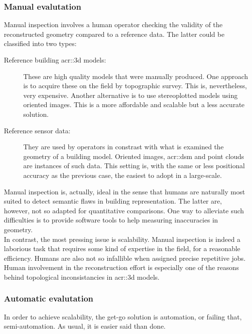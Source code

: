         \subsubsection{Manual evalutation}
            Manual inspection involves a human operator checking the validity of the reconstructed geometry compared to a reference data.
            The latter could be classified into two types:
            \begin{description}
                \item[Reference building \gls{acr::3d} models:] These are high quality models that were manually produced.
                    One approach is to acquire these on the field by topographic survey.
                    This is, nevertheless, very expensive.
                    Another alternative is to use stereoplotted models using oriented images.
                    This is a more affordable and scalable but a less accurate solution.
                \item[Reference sensor data:] They are used by operators in constrast with what is examined the geometry of a building model.
                    Oriented images, \gls{acr::dsm} and point clouds are instances of such data.
                    This setting is, with the same or less positional accuracy as the previous case, the easiest to adopt in a large-scale.
            \end{description}

            Manual inspection is, actually, ideal in the sense that humans are naturally most suited to detect semantic flaws in building representation.
            The latter are, however, not so adapted for quantitative comparisons.
            One way to alleviate such difficulties is to provide software tools to help measuring inaccuracies in geometry\addref.\\

            In contrast, the most pressing issue is scalability.
            Manual inspection is indeed a laborious task that requires some kind of expertise in the field, for a reasonable efficiency.
            Humans are also not so infallible when assigned precise repetitive jobs.
            Human involvement in the reconstruction effort is especially one of the reasons behind topological inconsistancies in \gls{acr::3d} models.

        \subsubsection{Automatic evalutation}
            In order to achieve scalability, the get-go solution is automation, or failing that, semi-automation.
            As usual, it is easier said than done.\\

